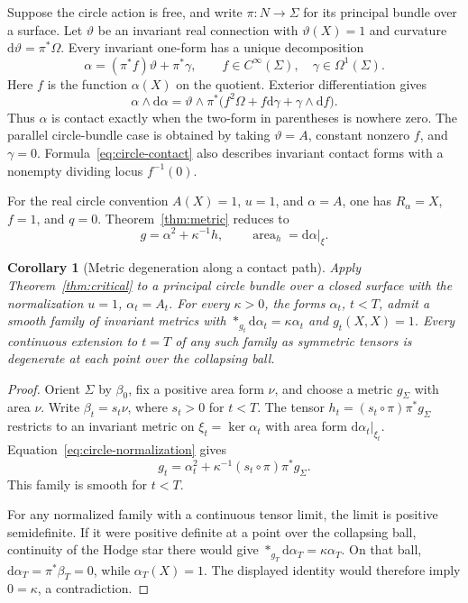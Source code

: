 \documentclass[11pt,a4paper]{article}
\numberwithin{equation}{section}
\newtheorem{corollary}[theorem]{Corollary}
\theoremstyle{definition}
\theoremstyle{remark}
\newcommand{\dd}{\mathrm d}
\begin{document}
Suppose the circle action is free, and write $\pi:N\to\Sigma$ for its
principal bundle over a surface. Let $\vartheta$ be an invariant real
connection with $\vartheta(X)=1$ and curvature
$\dd\vartheta=\pi^*\Omega$. Every invariant one-form has a unique
decomposition
\begin{equation}\label{eq:circle-form}
 \alpha=(\pi^*f)\vartheta+\pi^*\gamma,
 \qquad f\in C^\infty(\Sigma),\quad\gamma\in\Omega^1(\Sigma).
\end{equation}
Here $f$ is the function $\alpha(X)$ on the quotient. Exterior
differentiation gives
\begin{equation}\label{eq:circle-contact}
 \alpha\wedge\dd\alpha
 =\vartheta\wedge\pi^*
       \bigl(f^2\Omega+f\dd\gamma+\gamma\wedge\dd f\bigr).
\end{equation}
Thus $\alpha$ is contact exactly when the two-form in parentheses
is nowhere zero. The parallel circle-bundle case is obtained by taking
$\vartheta=A$, constant nonzero $f$, and $\gamma=0$.
Formula~\eqref{eq:circle-contact} also describes
invariant contact forms with a nonempty dividing locus $f^{-1}(0)$.

For the real circle convention $A(X)=1$, $u=1$, and
$\alpha=A$, one has $R_\alpha=X$, $f=1$, and $q=0$.
Theorem~\ref{thm:metric} reduces to
\begin{equation}\label{eq:circle-normalization}
 g=\alpha^2+\kappa^{-1}h,\qquad
 \operatorname{area}_h=\dd\alpha|_\xi.
\end{equation}

\begin{corollary}[Metric degeneration along a contact path]
\label{cor:metric-degeneration}
Apply Theorem~\ref{thm:critical} to a principal circle bundle over a
closed surface with the normalization $u=1$, $\alpha_t=A_t$.
For every $\kappa>0$, the forms $\alpha_t$, $t<T$, admit a smooth family
of invariant metrics with $*_{g_t}\dd\alpha_t=\kappa\alpha_t$ and
$g_t(X,X)=1$. Every continuous extension to $t=T$ of any such family
as symmetric tensors is degenerate at each point over the collapsing ball.
\end{corollary}

\begin{proof}
Orient $\Sigma$ by $\beta_0$, fix a positive area form $\nu$, and choose
a metric $g_\Sigma$ with area $\nu$. Write $\beta_t=s_t\nu$, where
$s_t>0$ for $t<T$. The tensor
$h_t=(s_t\circ\pi)\pi^*g_\Sigma$ restricts to an invariant metric on
$\xi_t=\ker\alpha_t$ with area form $\dd\alpha_t|_{\xi_t}$.
Equation~\eqref{eq:circle-normalization} gives
\[
 g_t=\alpha_t^2+\kappa^{-1}(s_t\circ\pi)\pi^*g_\Sigma.
\]
This family is smooth for $t<T$.

For any normalized family with a continuous tensor limit, the limit is
positive semidefinite. If it were positive definite at a point over the
collapsing ball, continuity of the Hodge star there would give
$*_{g_T}\dd\alpha_T=\kappa\alpha_T$. On that ball,
$\dd\alpha_T=\pi^*\beta_T=0$, while $\alpha_T(X)=1$.
The displayed identity would therefore imply $0=\kappa$, a contradiction.
\end{proof}
\end{document}
